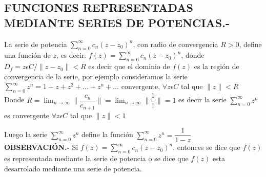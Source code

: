 \documentclass[10pt,a4paper]{article}
\begin{document}
\subsection{FUNCIONES REPRESENTADAS MEDIANTE SERIES DE POTENCIAS.-}
La serie de potencia  $\displaystyle{\sum_{n = 0}^{\infty} c_n (z-z_0)^n}$, con radio de convergencia $R>0$, define una función de $z$, es decir:  $\displaystyle{f(z) = \sum_{n = 0}^{\infty} c_n (z-z_0)^n}$, donde $\displaystyle{D_f = {z  \epsilon  C  /  \parallel z - z_0 \parallel < R}}$ es decir que el dominio de $f(z)$ es la región de convergencia de la serie, por ejemplo consideramos la serie $\displaystyle{\sum_{n = 0}^{\infty} z^n = 1 + z + z^2 + ... + z^n+...}$ convergente, $\displaystyle{\forall z \epsilon C}$ tal que $\parallel z \parallel < R$ \\
Donde $\displaystyle{R = \lim_{n \to \infty} \parallel \dfrac{c_n}{c_{n+1}} \parallel = \lim_{n \to \infty} \parallel \dfrac{1}{1} \parallel = 1 }$ es decir la serie $\displaystyle{\sum_{n = 0}^{\infty} z^n}$ es convergente $\forall z \epsilon C$ tal que $\parallel z \parallel < 1$

Luego la serie $\displaystyle{\sum_{n = 0}^{\infty} z^n}$ define la función $\displaystyle{\sum_{n = 0}^{\infty} z^n = \dfrac{1}{1-z}}$\\
\textbf{OBSERVACIÓN.-} Si $\displaystyle{f(z) = \sum_{n = 0}^{\infty} c_n (z-z_0)^n}$, entonces se dice que $f(z)$ es representada mediante la serie de potencia o se dice que $f(z)$ esta desarrolado mediante una serie de potencia.
\end{document}
